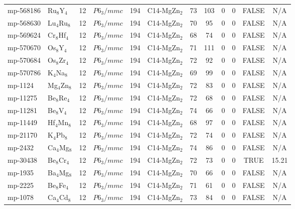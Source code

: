 {\begin{longtable}{llcccccccccc}
    mp-568186 & Ru$_{8}$Y$_{4}$ & 12    & $P6_3/mmc$ & 194   & C14-MgZn$_{2}$ & 73    & 103   & 0     & 0     & FALSE & N/A \\
    mp-568630 & Lu$_{4}$Ru$_{8}$ & 12    & $P6_3/mmc$ & 194   & C14-MgZn$_{2}$ & 70    & 95    & 0     & 0     & FALSE & N/A \\
    mp-569624 & Cr$_{8}$Hf$_{4}$ & 12    & $P6_3/mmc$ & 194   & C14-MgZn$_{2}$ & 68    & 74    & 0     & 0     & FALSE & N/A \\
    mp-570670 & Os$_{8}$Y$_{4}$ & 12    & $P6_3/mmc$ & 194   & C14-MgZn$_{2}$ & 71    & 111   & 0     & 0     & FALSE & N/A \\
    mp-570684 & Os$_{8}$Zr$_{4}$ & 12    & $P6_3/mmc$ & 194   & C14-MgZn$_{2}$ & 72    & 92    & 0     & 0     & FALSE & N/A \\
    mp-570786 & K$_{4}$Na$_{8}$ & 12    & $P6_3/mmc$ & 194   & C14-MgZn$_{2}$ & 69    & 99    & 0     & 0     & FALSE & N/A \\
    mp-1124 & Mg$_{4}$Zn$_{8}$ & 12    & $P6_3/mmc$ & 194   & C14-MgZn$_{2}$ & 72    & 83    & 0     & 0     & FALSE & N/A \\
    mp-11275 & Be$_{8}$Re$_{4}$ & 12    & $P6_3/mmc$ & 194   & C14-MgZn$_{2}$ & 72    & 68    & 0     & 0     & FALSE & N/A \\
    mp-11281 & Be$_{8}$V$_{4}$ & 12    & $P6_3/mmc$ & 194   & C14-MgZn$_{2}$ & 74    & 66    & 0     & 0     & FALSE & N/A \\
    mp-11449 & Hf$_{4}$Mn$_{8}$ & 12    & $P6_3/mmc$ & 194   & C14-MgZn$_{2}$ & 68    & 97    & 0     & 0     & FALSE & N/A \\
    mp-21170 & K$_{4}$Pb$_{8}$ & 12    & $P6_3/mmc$ & 194   & C14-MgZn$_{2}$ & 72    & 74    & 0     & 0     & FALSE & N/A \\
    mp-2432 & Ca$_{4}$Mg$_{8}$ & 12    & $P6_3/mmc$ & 194   & C14-MgZn$_{2}$ & 74    & 86    & 0     & 0     & FALSE & N/A \\
    mp-30438 & Be$_{8}$Cr$_{4}$ & 12    & $P6_3/mmc$ & 194   & C14-MgZn$_{2}$ & 72    & 73    & 0     & 0     & TRUE  & 15.21  \\
    mp-1935 & Ba$_{4}$Mg$_{8}$ & 12    & $P6_3/mmc$ & 194   & C14-MgZn$_{2}$ & 70    & 66    & 0     & 0     & FALSE & N/A \\
    mp-2225 & Be$_{8}$Fe$_{4}$ & 12    & $P6_3/mmc$ & 194   & C14-MgZn$_{2}$ & 71    & 61    & 0     & 0     & FALSE & N/A \\
    mp-1078 & Ca$_{4}$Cd$_{8}$ & 12    & $P6_3/mmc$ & 194   & C14-MgZn$_{2}$ & 73    & 84    & 0     & 0     & FALSE & N/A \\

\end{longtable}}
